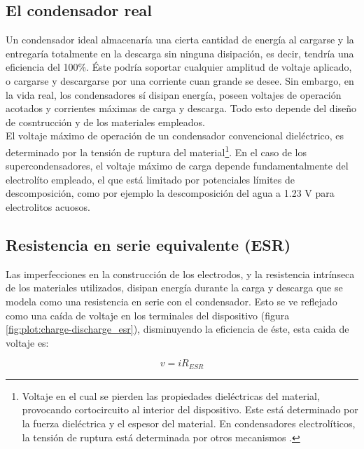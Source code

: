 \subsection{El condensador real}
Un condensador ideal almacenaría una cierta cantidad de energía al cargarse y la entregaría totalmente en la descarga sin ninguna disipación, es decir, tendría una eficiencia del 100\%. Éste podría soportar cualquier amplitud de voltaje aplicado, o cargarse y descargarse por una corriente cuan grande se desee.  Sin embargo, en la vida real, los condensadores sí disipan energía, poseen voltajes de operación acotados y corrientes máximas de carga y descarga. Todo esto depende del diseño de cosntrucción y de los materiales empleados.\\
El voltaje máximo de operación de un condensador convencional dieléctrico, es determinado por la tensión de ruptura del material\footnote{Voltaje en el cual se pierden las propiedades dieléctricas del material, provocando cortocircuito al interior del dispositivo. Este está determinado por la fuerza dieléctrica y el espesor del material. En condensadores electrolíticos, la tensión de ruptura está determinada por otros mecanismos \citep{Yahalom1971}.}. En el caso de los supercondensadores, el voltaje máximo de carga depende fundamentalmente del electrolíto empleado, el que está limitado por potenciales límites de descomposición, como por ejemplo la descomposición del agua a 1.23 V para electrolitos acuosos.\\

\subsection{Resistencia en serie equivalente (ESR)}
Las imperfecciones en la construcción de los electrodos, y la resistencia intrínseca de los materiales utilizados, disipan energía durante la carga y descarga que se modela como una resistencia en serie con el condensador. Esto se ve reflejado como una caída de voltaje en los terminales del dispositivo (figura \ref{fig:plot:charge-discharge_esr}), disminuyendo la eficiencia de éste, esta caida de voltaje es:

\begin{equation}
	v = iR_{ESR}
\end{equation}

